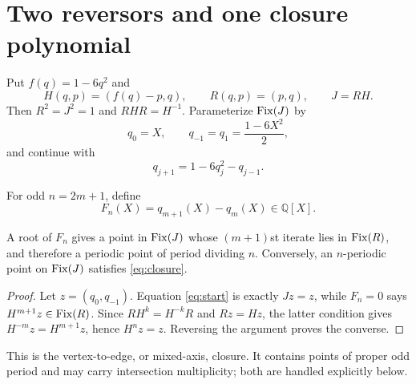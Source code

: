 \section{Two reversors and one closure polynomial}

Put $f(q)=1-6q^2$ and
\[
H(q,p)=(f(q)-p,q),\qquad R(q,p)=(p,q),\qquad J=RH.
\]
Then $R^2=J^2=1$ and $RHR=H^{-1}$.  Parameterize $\operatorname{Fix}(J)$ by
\begin{equation}\label{eq:start}
q_0=X,\qquad q_{-1}=q_1=\frac{1-6X^2}{2},
\end{equation}
and continue with
\begin{equation}\label{eq:recurrence}
q_{j+1}=1-6q_j^2-q_{j-1}.
\end{equation}

For odd $n=2m+1$, define
\begin{equation}\label{eq:closure}
F_n(X)=q_{m+1}(X)-q_m(X)\in\mathbb Q[X].
\end{equation}

\begin{proposition}\label{prop:mixed}
A root of $F_n$ gives a point in $\operatorname{Fix}(J)$ whose $(m+1)$st iterate lies in
$\operatorname{Fix}(R)$, and therefore a periodic point of period dividing $n$.
Conversely, an $n$-periodic point on $\operatorname{Fix}(J)$ satisfies \eqref{eq:closure}.
\end{proposition}

\begin{proof}
Let $z=(q_0,q_{-1})$.  Equation \eqref{eq:start} is exactly $Jz=z$, while
$F_n=0$ says $H^{m+1}z\in\operatorname{Fix}(R)$.  Since $RH^k=H^{-k}R$ and $Rz=Hz$,
the latter condition gives $H^{-m}z=H^{m+1}z$, hence $H^nz=z$.  Reversing
the argument proves the converse.
\end{proof}

This is the vertex-to-edge, or mixed-axis, closure.  It contains points of
proper odd period and may carry intersection multiplicity; both are handled
explicitly below.

